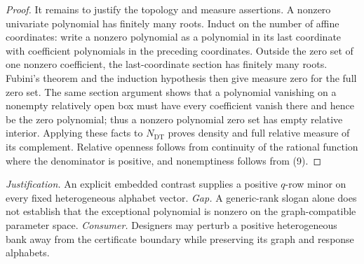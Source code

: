 \documentclass{article}
\begin{document}
\begin{proof}
It remains to justify the topology and measure assertions.  A nonzero univariate polynomial has finitely many roots.  Induct on the number of affine coordinates: write a nonzero polynomial as a polynomial in its last coordinate with coefficient polynomials in the preceding coordinates.  Outside the zero set of one nonzero coefficient, the last-coordinate section has finitely many roots.  Fubini's theorem and the induction hypothesis then give measure zero for the full zero set.  The same section argument shows that a polynomial vanishing on a nonempty relatively open box must have every coefficient vanish there and hence be the zero polynomial; thus a nonzero polynomial zero set has empty relative interior.  Applying these facts to \(N_{\mathrm{DT}}\) proves density and full relative measure of its complement.  Relative openness follows from continuity of the rational function where the denominator is positive, and nonemptiness follows from (9).
\end{proof}
\par\smallskip\noindent \textit{Justification.} An explicit embedded contrast supplies a positive \(q\)-row minor on every fixed heterogeneous alphabet vector. \textit{Gap.} A generic-rank slogan alone does not establish that the exceptional polynomial is nonzero on the graph-compatible parameter space. \textit{Consumer.} Designers may perturb a positive heterogeneous bank away from the certificate boundary while preserving its graph and response alphabets.
\end{document}

